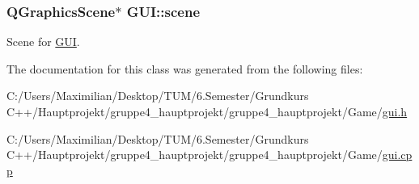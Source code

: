\subsubsection[{\texorpdfstring{scene}{scene}}]{\setlength{\rightskip}{0pt plus 5cm}Q\+Graphics\+Scene$\ast$ G\+U\+I\+::scene}\hypertarget{class_g_u_i_a52022e4c94d0e0378ed17b2348ed02db}{}\label{class_g_u_i_a52022e4c94d0e0378ed17b2348ed02db}


Scene for \hyperlink{class_g_u_i}{G\+UI}. 



The documentation for this class was generated from the following files\+:\begin{DoxyCompactItemize}
\item 
C\+:/\+Users/\+Maximilian/\+Desktop/\+T\+U\+M/6.\+Semester/\+Grundkurs C++/\+Hauptprojekt/gruppe4\+\_\+hauptprojekt/gruppe4\+\_\+hauptprojekt/\+Game/\hyperlink{gui_8h}{gui.\+h}\item 
C\+:/\+Users/\+Maximilian/\+Desktop/\+T\+U\+M/6.\+Semester/\+Grundkurs C++/\+Hauptprojekt/gruppe4\+\_\+hauptprojekt/gruppe4\+\_\+hauptprojekt/\+Game/\hyperlink{gui_8cpp}{gui.\+cpp}\end{DoxyCompactItemize}
